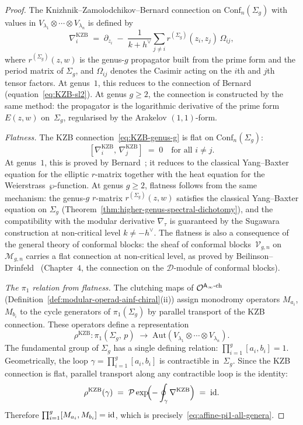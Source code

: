 \begin{proof}
The Knizhnik--Zamolodchikov--Bernard connection on
$\mathrm{Conf}_n(\Sigma_g)$ with values in
$V_{\lambda_1} \otimes \cdots \otimes V_{\lambda_n}$
is defined by
\begin{equation}\label{eq:KZB-genus-g}
\nabla_i^{\mathrm{KZB}}
\;=\;
\partial_{z_i}
\;-\;
\frac{1}{k + h^\vee}
\sum_{j \ne i}
r^{(\Sigma_g)}(z_i, z_j)\, \Omega_{ij},
\end{equation}
where $r^{(\Sigma_g)}(z,w)$ is the genus-$g$ propagator
built from the prime form and the period matrix of
$\Sigma_g$, and $\Omega_{ij}$ denotes the Casimir
acting on the $i$th and $j$th tensor factors.
At genus~$1$, this reduces to the connection of
Bernard~\cite{Ber88}
\textup{(}equation~\eqref{eq:KZB-sl2}\textup{)}.
At genus $g \ge 2$, the connection is constructed by
the same method: the propagator is the logarithmic
derivative of the prime form $E(z,w)$ on~$\Sigma_g$,
regularised by the Arakelov $(1,1)$-form.

\medskip\noindent
\emph{Flatness.}
The KZB connection~\eqref{eq:KZB-genus-g} is flat
on $\mathrm{Conf}_n(\Sigma_g)$:
\[
[\nabla_i^{\mathrm{KZB}},\,
 \nabla_j^{\mathrm{KZB}}]
\;=\; 0
\quad \text{for all } i \ne j.
\]
At genus~$1$, this is proved by
Bernard~\cite{Ber88}; it reduces to the classical
Yang--Baxter equation for the elliptic $r$-matrix
together with the heat equation for the
Weierstrass~$\wp$-function.
At genus $g \ge 2$, flatness follows from the same
mechanism: the genus-$g$ $r$-matrix
$r^{(\Sigma_g)}(z,w)$ satisfies the classical
Yang--Baxter equation on $\Sigma_g$
\textup{(}Theorem~\ref{thm:higher-genus-spectral-dichotomy}\textup{)},
and the compatibility with the modular
derivative $\nabla_\tau$ is guaranteed by the
Sugawara construction at non-critical level
$k \ne -h^\vee$.
The flatness is also a consequence of the general
theory of conformal blocks: the sheaf of conformal
blocks~$\mathcal{V}_{g,n}$ on $\mathcal{M}_{g,n}$
carries a flat connection at non-critical level,
as proved by Beilinson--Drinfeld~\cite{BD04}
\textup{(}Chapter~$4$, the connection on the
$\mathcal{D}$-module of conformal blocks\textup{)}.

\medskip\noindent
\emph{The $\pi_1$ relation from flatness.}
The clutching maps of
$\mathcal{O}^{\mathsf{A}_{\infty}\text{-ch}}$
\textup{(}Definition~\ref{def:modular-operad-ainf-chiral}(ii)\textup{)}
assign monodromy operators $M_{a_i}$, $M_{b_i}$
to the cycle generators of $\pi_1(\Sigma_g)$ by
parallel transport of the KZB connection.
These operators define a representation
\[
\rho^{\mathrm{KZB}}\colon
\pi_1(\Sigma_g,\, p)
\;\longrightarrow\;
\mathrm{Aut}(V_{\lambda_1}
\otimes \cdots \otimes V_{\lambda_n}).
\]
The fundamental group of $\Sigma_g$ has a single
defining relation:
$\prod_{i=1}^g [a_i, b_i] = 1$.
Geometrically, the loop
$\gamma = \prod_{i=1}^g [a_i, b_i]$ is
contractible in~$\Sigma_g$.
Since the KZB connection is flat, parallel transport
along any contractible loop is the identity:
\[
\rho^{\mathrm{KZB}}(\gamma)
\;=\;
\mathcal{P}\exp\!\Bigl(
-\oint_\gamma \nabla^{\mathrm{KZB}}
\Bigr)
\;=\;
\mathrm{id}.
\]
Therefore
$\prod_{i=1}^g [M_{a_i}, M_{b_i}] = \mathrm{id}$,
which is
precisely~\eqref{eq:affine-pi1-all-genera}.


\end{proof}

